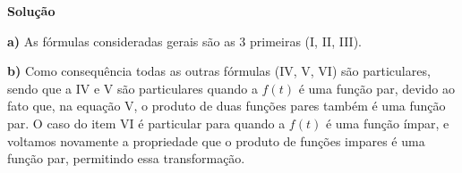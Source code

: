 \linespread{1.5}

\textbf{Solução}

\textbf{a)} As fórmulas consideradas gerais são as 3 primeiras (I, II, III).

\textbf{b)} Como consequência todas as outras fórmulas (IV, V, VI) são particulares, sendo que a IV e V são particulares quando a $f(t)$ é uma função par, devido ao fato que, na equação V, o produto de duas funções pares também é uma função par. 
O caso do item VI é particular para quando a $f(t)$ é uma função ímpar, e voltamos novamente a propriedade que o produto de funções impares é uma função par, permitindo essa transformação.
